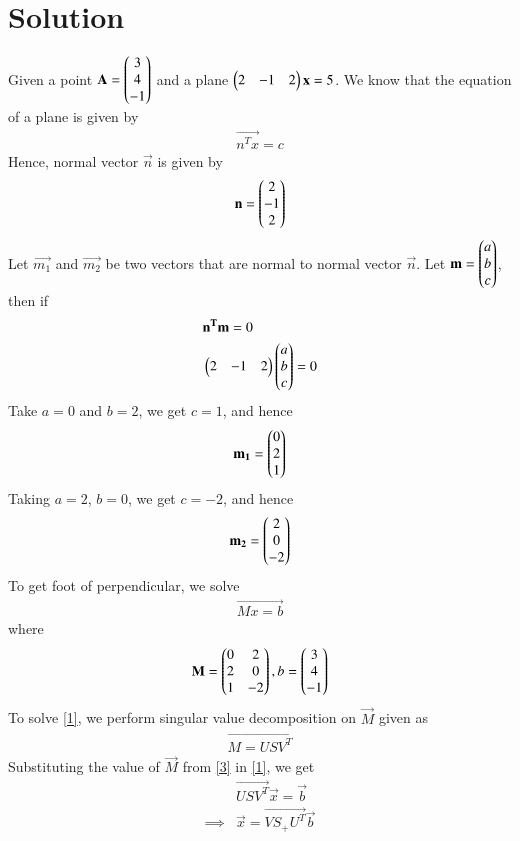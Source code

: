 \documentclass[journal,12pt,twocolumn]{IEEEtran}
\begin{document}
\section{Solution}
Given a point $\mathbf{A} = \begin{pmatrix}3 \\4\\-1\end{pmatrix}$  and a plane $\begin{pmatrix}2 & -1 & 2\end{pmatrix}\mathbf{x}=5$. We know that the equation of a plane is given by
\begin{align}
	\vec{n^Tx}= c
\end{align}
Hence, normal vector $\vec{n}$ is given by
\begin{align}
	\mathbf{n} = \begin{pmatrix}2 \\ -1\\ 2 \end{pmatrix}
\end{align}
Let $\vec{m_1}$ and $\vec{m_2}$ be two vectors that are normal to normal vector $\vec{n}$.
Let $\mathbf{m}= \begin{pmatrix}a\\b\\c\end{pmatrix}$, then if
\begin{align}
& \mathbf{n^Tm}= 0 \\
& \begin{pmatrix}2 & -1 &2\end{pmatrix}\begin{pmatrix}a\\b\\c\end{pmatrix} = 0
\end{align}
Take $a=0$ and $b=2$, we get $c=1$, and hence
\begin{align}
	\mathbf{m_1}= \begin{pmatrix}0\\2\\1\end{pmatrix}
\end{align}
Taking $a =2$, $b=0$, we get $c=-2$, and hence
\begin{align}
	\mathbf{m_2}= \begin{pmatrix}2\\0\\-2\end{pmatrix}
\end{align}
To get foot of perpendicular, we solve
\begin{align}
\vec{Mx=b} \label{1}
\end{align}
where
\begin{align}
\mathbf{M} = \begin{pmatrix}0 & 2 \\ 2 & 0 \\ 1 & -2\end{pmatrix},b = \begin{pmatrix}3 \\4\\-1\end{pmatrix}\label{2}	
\end{align}
To solve \eqref{1}, we perform singular value decomposition on $\vec{M}$ given as 
\begin{align}
	\vec{M = USV^T }\label{3}
\end{align}
Substituting the value of $\vec{M}$ from \eqref{3} in \eqref{1}, we get
\begin{align}
	&\vec{USV^T}\vec{x} = \vec{b} \\
\implies& \vec{x} = \vec{VS_+U^T}\vec{b}\label{4}
\end{align}
\end{document}
